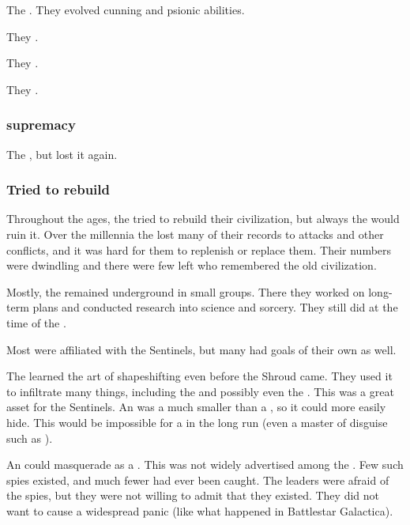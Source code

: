 The \ophidians{} . 
They evolved cunning and psionic abilities. 

They . 

They . 

They . 





\subsubsection{\QuilJaaran supremacy}
The \quiljaaran {}, but lost it again. 





\subsubsection{Tried to rebuild}
Throughout the ages, the \ophidians tried to rebuild their civilization, but always the  would ruin it.
Over the millennia the \ophidians lost many of their records to \noggyal attacks and other conflicts, and it was hard for them to replenish or replace them.
Their numbers were dwindling and there were few left who remembered the old \ophidian civilization. 

Mostly, the \ophidians remained underground in small groups.
There they worked on long-term plans and conducted research into science and sorcery. 
They still did at the time of the \thirdbanewar. 

Most \ophidians were affiliated with the Sentinels, but many had goals of their own as well.

The \ophidians learned the art of shapeshifting even before the Shroud came. 
They used it to infiltrate many things, including the \aryothim and possibly even the \resphain. 
This was a great asset for the Sentinels. 
An \ophidian was a much smaller \vertex than a \dragon, so it could more easily hide.
This would be impossible for a \dragon in the long run (even a master of disguise such as \Nzessuacrith). 

An \ophidian could masquerade as a \bezed. 
This was not widely advertised among the \resphain.
Few such spies existed, and much fewer had ever been caught. 
The \resphan leaders were afraid of the spies, but they were not willing to admit that they existed.
They did not want to cause a widespread panic (like what happened in Battlestar Galactica).





